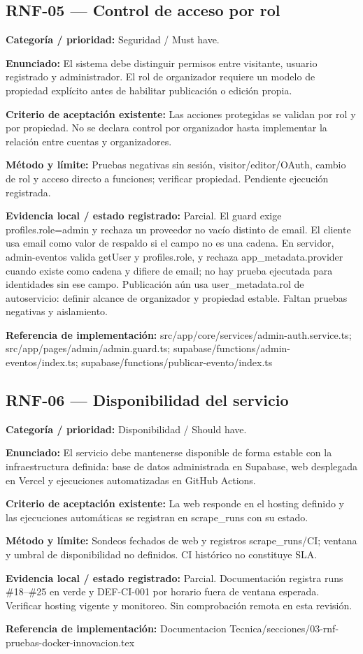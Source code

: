 \subsection{RNF-05 — Control de acceso por rol}
\textbf{Categoría / prioridad:} Seguridad / Must have.\par
\textbf{Enunciado:} El sistema debe distinguir permisos entre visitante, usuario registrado y administrador. El rol de organizador requiere un modelo de propiedad explícito antes de habilitar publicación o edición propia.\par
\textbf{Criterio de aceptación existente:} Las acciones protegidas se validan por rol y por propiedad. No se declara control por organizador hasta implementar la relación entre cuentas y organizadores.\par
\textbf{Método y límite:} Pruebas negativas sin sesión, visitor/editor/OAuth, cambio de rol y acceso directo a funciones; verificar propiedad. Pendiente ejecución registrada.\par
\textbf{Evidencia local / estado registrado:} Parcial. El guard exige profiles.role=admin y rechaza un proveedor no vacío distinto de email. El cliente usa email como valor de respaldo si el campo no es una cadena. En servidor, admin-eventos valida getUser y profiles.role, y rechaza app\_metadata.provider cuando existe como cadena y difiere de email; no hay prueba ejecutada para identidades sin ese campo. Publicación aún usa user\_metadata.rol de autoservicio: definir alcance de organizador y propiedad estable. Faltan pruebas negativas y aislamiento.\par
\textbf{Referencia de implementación:} src/app/core/services/admin-auth.service.ts; src/app/pages/admin/admin.guard.ts; supabase/functions/admin-eventos/index.ts; supabase/functions/publicar-evento/index.ts\par

\subsection{RNF-06 — Disponibilidad del servicio}
\textbf{Categoría / prioridad:} Disponibilidad / Should have.\par
\textbf{Enunciado:} El servicio debe mantenerse disponible de forma estable con la infraestructura definida: base de datos administrada en Supabase, web desplegada en Vercel y ejecuciones automatizadas en GitHub Actions.\par
\textbf{Criterio de aceptación existente:} La web responde en el hosting definido y las ejecuciones automáticas se registran en scrape\_runs con su estado.\par
\textbf{Método y límite:} Sondeos fechados de web y registros scrape\_runs/CI; ventana y umbral de disponibilidad no definidos. CI histórico no constituye SLA.\par
\textbf{Evidencia local / estado registrado:} Parcial. Documentación registra runs \#18–\#25 en verde y DEF-CI-001 por horario fuera de ventana esperada. Verificar hosting vigente y monitoreo. Sin comprobación remota en esta revisión.\par
\textbf{Referencia de implementación:} Documentacion Tecnica/secciones/03-rnf-pruebas-docker-innovacion.tex\par

